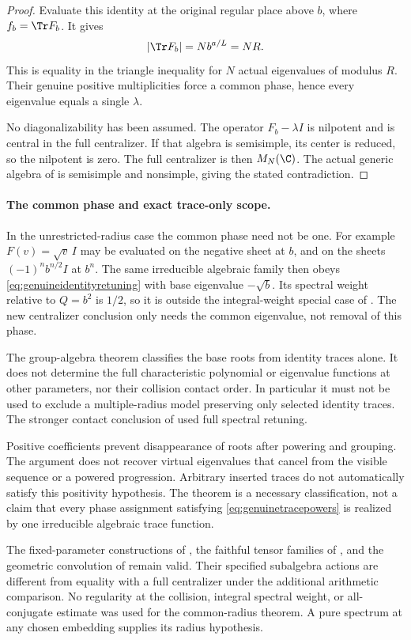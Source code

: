 \begin{proof}
Evaluate this identity at the original regular place
above $b$, where $f_b=\Tr F_b$.
It gives
\[
 |\Tr F_b|=N b^{a/L}=NR.
\]
This is equality in the triangle inequality for $N$
actual eigenvalues of modulus $R$.
Their genuine positive multiplicities force a common
phase, hence every eigenvalue equals a single $\lambda$.

No diagonalizability has been assumed.
The operator $F_b-\lambda I$ is nilpotent and is
central in the full centralizer.
If that algebra is semisimple, its center is reduced,
so the nilpotent is zero.
The full centralizer is then $M_N(\C)$.
The actual generic algebra of  is semisimple
and nonsimple, giving the stated contradiction.
\end{proof}

\paragraph{The common phase and exact trace-only scope.}
In the unrestricted-radius case the common phase need
not be one.
For example $F(v)=\sqrt v\,I$ may be evaluated on the
negative sheet at $b$, and on the sheets
$(-1)^n b^{n/2}I$ at $b^n$.
The same irreducible algebraic family then obeys
\eqref{eq:genuineidentityretuning} with base eigenvalue
$-\sqrt b$.
Its spectral weight relative to $Q=b^2$ is $1/2$,
so it is outside the integral-weight special case
of .
The new centralizer conclusion only needs the common
eigenvalue, not removal of this phase.

The group-algebra theorem classifies the base roots
from identity traces alone.
It does not determine the full characteristic
polynomial or eigenvalue functions at other parameters,
nor their collision contact order.
In particular it must not be used to exclude a
multiple-radius model preserving only selected
identity traces.
The stronger contact conclusion of  used
full spectral retuning.

Positive coefficients prevent disappearance of roots
after powering and grouping.
The argument does not recover virtual eigenvalues
that cancel from the visible sequence or a powered
progression.
Arbitrary inserted traces do not automatically
satisfy this positivity hypothesis.
The theorem is a necessary classification, not a
claim that every phase assignment satisfying
\eqref{eq:genuinetracepowers} is realized by one
irreducible algebraic trace function.

The fixed-parameter constructions of ,
the faithful tensor families of , and the
geometric convolution of  remain valid.
Their specified subalgebra actions are different
from equality with a full centralizer under the
additional arithmetic comparison.
No regularity at the collision, integral spectral
weight, or all-conjugate estimate was used for the
common-radius theorem. A pure spectrum at any chosen
embedding supplies its radius hypothesis.

